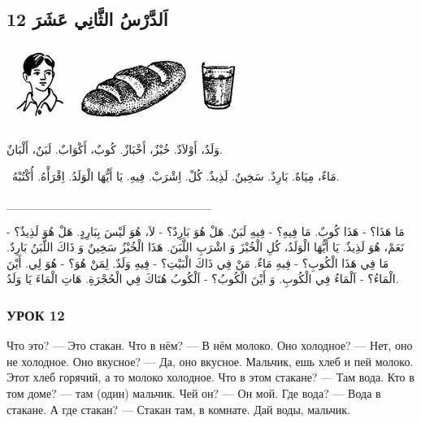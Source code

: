 \documentclass[a5paper]{article}
\begin{document}
\subsection[12 اَلدَّرْسُ الثَّانِي عَشَرَ]{12 اَلدَّرْسُ الثَّانِي عَشَرَ}
\  \includegraphics[width=0.7398in,height=1.0209in]{images/MuhammadBagauddinprettified-img019.jpg}   \includegraphics[width=1.5102in,height=1.0311in]{images/MuhammadBagauddinprettified-img020.jpg}   \includegraphics[width=0.5835in,height=1.0311in]{images/MuhammadBagauddinprettified-img021.jpg} 

وَلَدٌ، أَوْلاَدٌ. خُبْزٌ، أَخْبَازٌ. كُوبٌ، أَكْوَابٌ. لَبَنٌ، أَلْبَانٌ.

\ مَاءٌ، مِيَاهٌ. بَارِدٌ. سَخِينٌ. لَذِيذٌ. كُلْ. اِشْرَبْ. فِيهِ. يَا أَيُّهَا الْوَلَدُ. اِقْرَأْهُ. أُكْتُبْهُ.

\_\_\_\_\_\_\_\_\_\_\_\_\_\_\_\_\_\_\_\_\_\_\_\_ 

مَا هَذَا؟ - هَذَا كُوبٌ. مَا فِيهِ؟ - فِيهِ لَبَنٌ. هَلْ هُوَ بَارِدٌ؟ - لاَ، هُوَ لَيْسَ بِبَارِدٍ. هَلْ هُوَ لَذِيذٌ؟ - نَعَمْ، هُوَ لَذِيذٌ. يَا أَيُّهَا الْوَلَدُ، كُلِ الْخُبْزَ وَ اشْرَبِ اللَّبَنَ. هَذَا الْخُبْزُ سَخِينٌ وَ ذَاكَ اللَّبَنُ بَارِدٌ. مَا فِي هَذَا الْكُوبِ؟ - فِيهِ مَاءٌ. مَنْ فِي ذَاكَ الْبَيْتِ؟ - فِيهِ وَلَدٌ. لِمَنْ هُوَ؟ - هُوَ لِي. أَيْنَ الْمَاءُ؟ - اَلْمَاءُ فِي الْكُوبِ. وَ أَيْنَ الْكُوبُ؟ - اَلْكُوبُ هُنَاكَ فِي الْحُجْرَةِ. هَاتِ الْمَاءَ يَا وَلَدُ.

\subsubsection{УРОК 12}
Что это? — Это стакан. Что в нём? — В нём молоко. Оно холод­ное? — Нет, оно не холодное. Оно вкусное? — Да, оно вкусное. Мальчик, ешь хлеб и пей молоко. Этот хлеб горячий, а то молоко холодное. Что в этом стакане? — Там вода. Кто в том доме? — там (один) мальчик. Чей он? — Он мой. Где вода? — Вода в стакане. А где стакан? — Стакан там, в комнате. Дай воды, мальчик.
\end{document}
